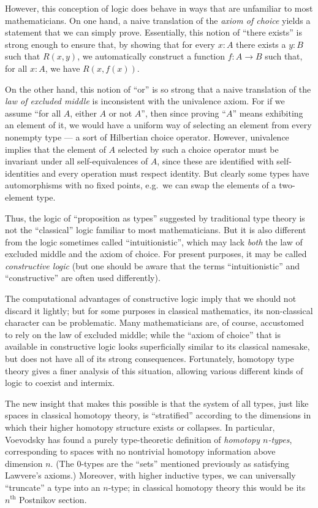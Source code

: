 However, this conception of logic does behave in ways that are unfamiliar to most mathematicians.
%
On one hand, a naive translation of the \emph{axiom of choice} yields a statement that we can simply prove.
Essentially, this notion of ``there exists'' is strong enough to ensure that, by showing that for every $x: A$ there exists a $y:B$ such that $R(x,y)$, we automatically construct a function $f : A\to B$ such that, for all $x:A$, we have $R(x, f(x))$.

%
%
On the other hand, this notion of ``or'' is so strong that a naive translation of the \emph{law of excluded middle} is inconsistent with the univalence axiom.
For if we assume ``for all $A$, either $A$ or not $A$'', then since proving ``$A$'' means exhibiting an element of it, we would have a uniform way of selecting an element from every nonempty type --- a sort of Hilbertian choice operator.
However, univalence implies that the element of $A$ selected by such a choice operator must be invariant under all self-equivalences of $A$, since these are identified with self-identities and every operation must respect identity.
But clearly some types have automorphisms with no fixed points, e.g.\ we can swap the elements of a two-element type.
%

Thus, the logic of ``proposition as types'' suggested by traditional type theory is not the ``classical'' logic familiar to most mathematicians.
But it is also different from the logic sometimes called ``intuitionistic'', which may lack \emph{both} the law of excluded middle and the axiom of choice. For present purposes, it may be called \emph{constructive logic}
%
(but one should be aware that the terms  ``intuitionistic'' and ``constructive'' are often used differently).

The computational advantages of constructive logic imply that we should not  discard it lightly; but for some purposes in classical mathematics, its non-classical character can be problematic.
Many mathematicians are, of course, accustomed to rely on the law of excluded middle; while the ``axiom of choice'' that is available in constructive logic looks superficially similar to its classical namesake, but does not have all of its strong consequences.
Fortunately, homotopy type theory gives a finer analysis of this situation,  allowing various different kinds of logic to coexist and intermix.

The new insight that makes this possible is that the system of all types, just like spaces in classical homotopy theory, is ``stratified'' according to the dimensions in which their higher homotopy structure exists or collapses.
In particular, Voevodsky has found a purely type-theoretic definition of \emph{homotopy $n$-types}, corresponding to spaces with no nontrivial homotopy information above dimension $n$.
(The $0$-types are the ``sets'' mentioned previously as satisfying Lawvere's axioms.)
Moreover, with higher inductive types, we can universally ``truncate'' a type into an $n$-type; in classical homotopy theory this would be its $n^{\mathrm{th}}$ Postnikov section.

